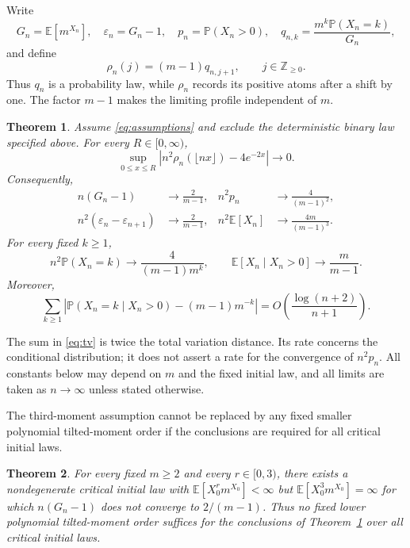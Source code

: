 \documentclass[11pt,letterpaper,reqno]{amsart}
\theoremstyle{plain}
\newtheorem{theorem}{Theorem}[section]
\newcommand{\E}{\mathbb E}\newcommand{\Pp}{\mathbb P}
\newcommand{\Zp}{\mathbb Z_{\ge0}}
\newcommand{\floor}[1]{\lfloor#1\rfloor}
\begin{document}
Write
\begin{equation}\label{eq:notation}
 G_n=\E[m^{X_n}],\quad \varepsilon_n=G_n-1,\quad p_n=\Pp(X_n>0),\quad
 q_{n,k}=\frac{m^k\Pp(X_n=k)}{G_n},
\end{equation}
and define
\begin{equation}\label{eq:rho}
 \rho_n(j)=(m-1)q_{n,j+1},\qquad j\in\Zp.
\end{equation}
Thus $q_n$ is a probability law, while $\rho_n$ records its positive atoms after a shift by one. The factor $m-1$ makes the limiting profile independent of $m$.

\begin{theorem}\label{thm:profile}
Assume \eqref{eq:assumptions} and exclude the deterministic binary law specified above. For every $R\in[0,\infty)$,
\begin{equation}\label{eq:mainprofile}
 \sup_{0\le x\le R}\left|n^2\rho_n(\floor{nx})-4e^{-2x}\right|\longrightarrow0.
\end{equation}
Consequently,
\begin{align}
 n(G_n-1)&\longrightarrow\frac2{m-1}, &
 n^2p_n&\longrightarrow\frac4{(m-1)^2},\label{eq:main1}\\
 n^2(\varepsilon_n-\varepsilon_{n+1})&\longrightarrow\frac2{m-1}, &
 n^2\E[X_n]&\longrightarrow\frac{4m}{(m-1)^3}.\label{eq:main2}
\end{align}
For every fixed $k\ge1$,
\begin{equation}\label{eq:atoms}
 n^2\Pp(X_n=k)\longrightarrow \frac4{(m-1)m^k},\qquad
 \E[X_n\mid X_n>0]\longrightarrow\frac m{m-1}.
\end{equation}
Moreover,
\begin{equation}\label{eq:tv}
 \sum_{k\ge1}\left|\Pp(X_n=k\mid X_n>0)-(m-1)m^{-k}\right|
 =O\left(\frac{\log(n+2)}{n+1}\right).
\end{equation}
\end{theorem}

The sum in \eqref{eq:tv} is twice the total variation distance. Its rate concerns the conditional distribution; it does not assert a rate for the convergence of $n^2p_n$. All constants below may depend on $m$ and the fixed initial law, and all limits are taken as $n\to\infty$ unless stated otherwise.

The third-moment assumption cannot be replaced by any fixed smaller polynomial tilted-moment order if the conclusions are required for all critical initial laws.

\begin{theorem}\label{thm:sharpness}
For every fixed $m\ge2$ and every $r\in[0,3)$, there exists a nondegenerate critical initial law with $\E[X_0^rm^{X_0}]<\infty$ but $\E[X_0^3m^{X_0}]=\infty$ for which $n(G_n-1)$ does not converge to $2/(m-1)$. Thus no fixed lower polynomial tilted-moment order suffices for the conclusions of Theorem~\ref{thm:profile} over all critical initial laws.
\end{theorem}
\end{document}
